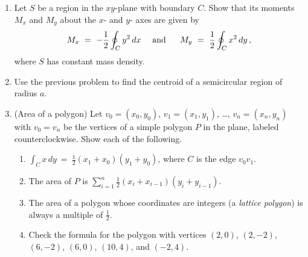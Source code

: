 \documentclass[12pt]{article}
\begin{document}
\begin{enumerate}
   
\item  Let $S$ be a region in the $xy$-plane with boundary $C$.
  Show that its moments $M_x$ and $M_y$ about the $x$- and $y$- axes are given by
  \[
  M_x\ =\ -\frac{1}{2}\oint_C y^2\, dx\quad \mbox{ and }\
  \quad
  M_y\ =\  \frac{1}{2}\oint_C x^2\, dy\,, \vspace{-2pt}
  \]
  where $S$ has constant mass density.
 \vspace{-2pt}

   
\item Use the previous problem to find the centroid of a semicircular region of radius $a$.

  
  
\item (Area of a polygon)
    Let $v_0=(x_0,y_0)$, $v_1=(x_1,y_1)$, \ldots, $v_n=(x_n,y_n)$ with $v_0=v_n$ be the vertices of a simple polygon $P$ in the plane,
    labeled counterclockwise.
    Show each of the following.
    \begin{enumerate}
    \item ${\displaystyle \int_C x\,dy\ =\ \frac{1}{2}}(x_1+x_0)(y_1+y_0)$, where $C$ is the edge $v_0 v_1$.

    \item The area of $P$ is ${\displaystyle \sum_{i=1}^n \frac{1}{2}(x_i+x_{i-1})(y_i+y_{i-1})  }$.

    \item The area of a polygon whose coordinates are integers (a {\color{blue}\sl lattice polygon}) is always a multiple of $\frac{1}{2}$.

    \item Check the formula for the polygon with vertices $(2,0)$, $(2,-2)$, $(6,-2)$, $(6,0)$, $(10,4)$, and $(-2,4)$.  \vspace{-2pt}
      
    \end{enumerate}

     



    
\end{enumerate}
\end{document}

